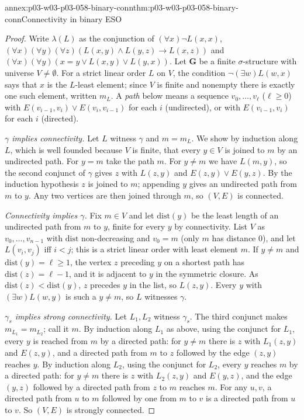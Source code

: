 \begin{annexitem}{annex:p03-w03-p03-058-binary-conn}{thm:p03-w03-p03-058-binary-conn}{Connectivity in binary ESO}
\begin{proof}
Write \(\lambda(L)\) as the conjunction of \((\forall x)\neg L(x,x)\),
\((\forall x)(\forall y)(\forall z)(L(x,y)\wedge L(y,z)\to L(x,z))\) and
\((\forall x)(\forall y)(x=y\vee L(x,y)\vee L(y,x))\). Let \(\mathbf G\) be a
finite \(\sigma\)-structure with universe \(V\ne\emptyset\). For a strict
linear order \(L\) on \(V\), the condition \(\neg(\exists w)L(w,x)\) says
that \(x\) is the \(L\)-least element; since \(V\) is finite and nonempty
there is exactly one such element, written \(m_L\). A \emph{path} below
means a sequence \(v_0,\ldots,v_\ell\) (\(\ell\ge0\)) with
\(E(v_{i-1},v_i)\vee E(v_i,v_{i-1})\) for each \(i\) (undirected), or with
\(E(v_{i-1},v_i)\) for each \(i\) (directed).

\emph{\(\gamma\) implies connectivity.} Let \(L\) witness \(\gamma\) and
\(m=m_L\). We show by induction along \(L\), which is well founded because
\(V\) is finite, that every \(y\in V\) is joined to \(m\) by an undirected
path. For \(y=m\) take the path \(m\). For \(y\ne m\) we have \(L(m,y)\), so
the second conjunct of \(\gamma\) gives \(z\) with \(L(z,y)\) and
\(E(z,y)\vee E(y,z)\). By the induction hypothesis \(z\) is joined to
\(m\); appending \(y\) gives an undirected path from \(m\) to \(y\). Any two
vertices are then joined through \(m\), so \((V,E)\) is connected.

\emph{Connectivity implies \(\gamma\).} Fix \(m\in V\) and let
\(\mathrm{dist}(y)\) be the least length of an undirected path from \(m\)
to \(y\), finite for every \(y\) by connectivity. List \(V\) as
\(v_0,\ldots,v_{n-1}\) with \(\mathrm{dist}\) non-decreasing and
\(v_0=m\) (only \(m\) has distance \(0\)), and let \(L(v_i,v_j)\) iff
\(i<j\); this is a strict linear order with least element \(m\). If
\(y\ne m\) and \(\mathrm{dist}(y)=\ell\ge1\), the vertex \(z\) preceding
\(y\) on a shortest path has \(\mathrm{dist}(z)=\ell-1\), and it is
adjacent to \(y\) in the symmetric closure. As
\(\mathrm{dist}(z)<\mathrm{dist}(y)\), \(z\) precedes \(y\) in the list, so
\(L(z,y)\). Every \(y\) with \((\exists w)L(w,y)\) is such a \(y\ne m\), so
\(L\) witnesses \(\gamma\).

\emph{\(\gamma_s\) implies strong connectivity.} Let \(L_1,L_2\) witness
\(\gamma_s\). The third conjunct makes \(m_{L_1}=m_{L_2}\); call it \(m\).
By induction along \(L_1\) as above, using the conjunct for \(L_1\), every
\(y\) is reached from \(m\) by a directed path: for \(y\ne m\) there is
\(z\) with \(L_1(z,y)\) and \(E(z,y)\), and a directed path from \(m\) to
\(z\) followed by the edge \((z,y)\) reaches \(y\). By induction along
\(L_2\), using the conjunct for \(L_2\), every \(y\) reaches \(m\) by a
directed path: for \(y\ne m\) there is \(z\) with \(L_2(z,y)\) and
\(E(y,z)\), and the edge \((y,z)\) followed by a directed path from \(z\)
to \(m\) reaches \(m\). For any \(u,v\), a directed path from \(u\) to
\(m\) followed by one from \(m\) to \(v\) is a directed path from \(u\) to
\(v\). So \((V,E)\) is strongly connected.


\end{proof}
\end{annexitem}
